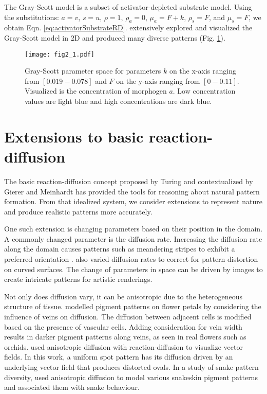 The Gray-Scott model is a subset of activator-depleted substrate model.	Using the substitutions: $a = v$, $s = u$, $\rho = 1$, $\rho_a = 0$, $\mu_a = F+k$, $\rho_s = F$, and $\mu_s = F$, we obtain Eqn. \ref{eq:activatorSubstrateRD}. \citet{pearson1993} extensively explored and visualized the Gray-Scott model in 2D and produced many diverse patterns (Fig. \ref{fig:grayscottParameterMap}). 

\begin{figure}[H]
	\centering
	\texttt{[image: fig2\_1.pdf]}
	\caption{Gray-Scott parameter space for parameters $k$ on the x-axis ranging from $[0.019 - 0.078]$ and $F$ on the y-axis ranging from $[0 - 0.11]$. Visualized is the concentration of morphogen $a$. Low concentration values are light blue and high concentrations are dark blue.}
	\label{fig:grayscottParameterMap}
\end{figure}

\section{Extensions to basic reaction-diffusion}
The basic reaction-diffusion concept proposed by Turing and contextualized by Gierer and Meinhardt has provided the tools for reasoning about natural pattern formation. From that idealized system, we consider extensions to represent nature and produce realistic patterns more accurately.

One such extension is changing parameters based on their position in the domain. A commonly changed parameter is the diffusion rate. Increasing the diffusion rate along the domain causes patterns such as meandering stripes to exhibit a preferred orientation \citep{zheng2009}. \citet{witkin1991} also varied diffusion rates to correct for pattern distortion on curved surfaces. The change of parameters in space can be driven by images to create intricate patterns for artistic renderings. 

Not only does diffusion vary, it can be anisotropic due to the heterogeneous structure of tissue. \citet{zhou2007} modelled pigment patterns on flower petals by considering the influence of veins on diffusion. The diffusion between adjacent cells is modified based on the presence of vascular cells. Adding consideration for vein width results in darker pigment patterns along veins, as seen in real flowers such as orchids. \citet{sanderson2004} used anisotropic diffusion with reaction-diffusion to visualize vector fields. In this work, a uniform spot pattern has its diffusion driven by an underlying vector field that produces distorted ovals. In a study of snake pattern diversity, \citet{allen2013} used anisotropic diffusion to model various snakeskin pigment patterns and associated them with snake behaviour.

